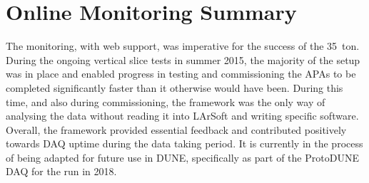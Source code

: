 \section{Online Monitoring Summary}

The monitoring, with web support, was imperative for the success of the 35~ton.  During the ongoing vertical slice tests in summer 2015, the majority of the setup was in place and enabled progress in testing and commissioning the APAs to be completed significantly faster than it otherwise would have been.  During this time, and also during commissioning, the framework was the only way of analysing the data without reading it into LArSoft and writing specific software.  Overall, the framework provided essential feedback and contributed positively towards DAQ uptime during the data taking period.  It is currently in the process of being adapted for future use in DUNE, specifically as part of the ProtoDUNE DAQ for the run in 2018.
